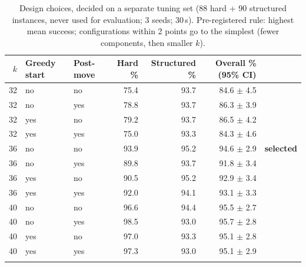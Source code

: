 \begin{table}[htbp]
\caption{Design choices, decided on a separate tuning set (88 hard + 90 structured instances, never used for evaluation; 3 seeds; 30\,s). Pre-registered rule: highest mean success; configurations within 2 points go to the simplest (fewer components, then smaller $k$).}
\label{tab:tuning}
\begin{tabular}{rllrrrl}
\toprule
$k$ & Greedy start & Post-move & Hard \% & Structured \% & Overall \% (95\% CI) &  \\
\midrule
32 & no & no & 75.4 & 93.7 & 84.6 $\pm$ 4.5 &  \\
32 & no & yes & 78.8 & 93.7 & 86.3 $\pm$ 3.9 &  \\
32 & yes & no & 79.2 & 93.7 & 86.5 $\pm$ 4.2 &  \\
32 & yes & yes & 75.0 & 93.3 & 84.3 $\pm$ 4.6 &  \\
36 & no & no & 93.9 & 95.2 & 94.6 $\pm$ 2.9 & \textbf{selected} \\
36 & no & yes & 89.8 & 93.7 & 91.8 $\pm$ 3.4 &  \\
36 & yes & no & 90.5 & 95.2 & 92.9 $\pm$ 3.4 &  \\
36 & yes & yes & 92.0 & 94.1 & 93.1 $\pm$ 3.3 &  \\
40 & no & no & 96.6 & 94.4 & 95.5 $\pm$ 2.7 &  \\
40 & no & yes & 98.5 & 93.0 & 95.7 $\pm$ 2.8 &  \\
40 & yes & no & 97.0 & 93.3 & 95.1 $\pm$ 2.8 &  \\
40 & yes & yes & 97.3 & 93.0 & 95.1 $\pm$ 2.9 &  \\
\botrule
\end{tabular}
\end{table}
